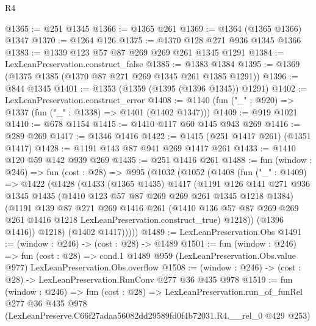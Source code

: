 \begin{lexlean}{R4}
\begin{coremodule}
@1365 := @251 @1345
@1366 := @1365 @261
@1369 := @1364 (@1365 @1366) @1347
@1370 := @1264 @126
@1375 := @1370 @128 @271 @936 @1345 @1366
@1383 := @1339 @123 @57 @87 @269 @269 @261 @1345 @1291
@1384 := LexLeanPreservation.construct_false
@1385 := @1383 @1384
@1395 := @1369 (@1375 @1385 (@1370 @87 @271 @269 @1345 @261 @1385 @1291))
@1396 := @844 @1345
@1401 := @1353 (@1359 (@1395 (@1396 @1345)) @1291)
@1402 := LexLeanPreservation.construct_error
@1408 := @1140 (fun ("_" : @920) => @1337 (fun ("_" : @1338) => @1401 (@1402 @1347)))
@1409 := @919 @1021
@1410 := @678 @1154
@1415 := @1410 @117 @60 @145 @943 @269
@1416 := @289 @269
@1417 := @1346 @1416
@1422 := @1415 (@251 @1417 @261) (@1351 @1417)
@1428 := @1191 @143 @87 @941 @269 @1417 @261
@1433 := @1410 @120 @59 @142 @939 @269
@1435 := @251 @1416 @261
@1488 := fun (window : @246) =>
  fun (cost : @28) =>
  @995
    (@1032
      (@1052
        (@1408
          (fun ("_" : @1409) =>
          @1422
            (@1428
              (@1433
                (@1365 @1435)
                @1417
                (@1191
                  @126
                  @141
                  @271
                  @936
                  @1345
                  @1435
                  (@1410 @123 @57 @87 @269 @269 @261 @1345 @1218 @1384)
                  (@1191
                    @139
                    @87
                    @271
                    @269
                    @1416
                    @261
                    (@1410
                      @136
                      @57
                      @87
                      @269
                      @269
                      @261
                      @1416
                      @1218
                      LexLeanPreservation.construct_true)
                    @1218))
                (@1396 @1416))
              @1218)
            (@1402 @1417)))))
@1489 := LexLeanPreservation.Obs
@1491 := (window : @246) -> (cost : @28) -> @1489
@1501 := fun (window : @246) =>
  fun (cost : @28) =>
  cond.{1} @1489 @959 (LexLeanPreservation.Obs.value @977) LexLeanPreservation.Obs.overflow
@1508 := (window : @246) -> (cost : @28) -> LexLeanPreservation.RunConv @277 @36 @435 @978
@1519 := fun (window : @246) =>
  fun (cost : @28) =>
  LexLeanPreservation.run_of_funRel
    @277
    @36
    @435
    @978
    (LexLeanPreserve.C66f27adaa56082dd29589fd0f4b72031.R4.__rel_0 @429 @253)
\end{coremodule}
\end{lexlean}
